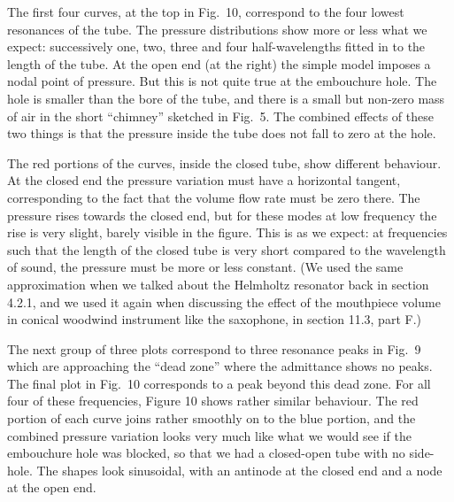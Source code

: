   The first four curves, at the top in Fig.\ 10, correspond to the four lowest 
  resonances of the tube. The pressure distributions show more or less what we 
  expect: successively one, two, three and four half-wavelengths fitted in to 
  the length of the tube. At the open end (at the right) the simple model 
  imposes a nodal point of pressure. But this is not quite true at the 
  embouchure hole. The hole is smaller than the bore of the tube, and there is 
  a small but non-zero mass of air in the short “chimney” sketched in Fig.\ 5. 
  The combined effects of these two things is that the pressure inside the tube 
  does not fall to zero at the hole. 

  The red portions of the curves, inside the closed tube, show different 
  behaviour. At the closed end the pressure variation must have a horizontal 
  tangent, corresponding to the fact that the volume flow rate must be zero 
  there. The pressure rises towards the closed end, but for these modes at low 
  frequency the rise is very slight, barely visible in the figure. This is as 
  we expect: at frequencies such that the length of the closed tube is very 
  short compared to the wavelength of sound, the pressure must be more or less 
  constant. (We used the same approximation when we talked about the Helmholtz 
  resonator back in section 4.2.1, and we used it again when discussing the 
  effect of the mouthpiece volume in conical woodwind instrument like the 
  saxophone, in section 11.3, part F.) 

  The next group of three plots correspond to three resonance peaks in Fig.\ 9 
  which are approaching the “dead zone” where the admittance shows no peaks. 
  The final plot in Fig.\ 10 corresponds to a peak beyond this dead zone. For 
  all four of these frequencies, Figure 10 shows rather similar behaviour. The 
  red portion of each curve joins rather smoothly on to the blue portion, and 
  the combined pressure variation looks very much like what we would see if the 
  embouchure hole was blocked, so that we had a closed-open tube with no 
  side-hole. The shapes look sinusoidal, with an antinode at the closed end and 
  a node at the open end. 

